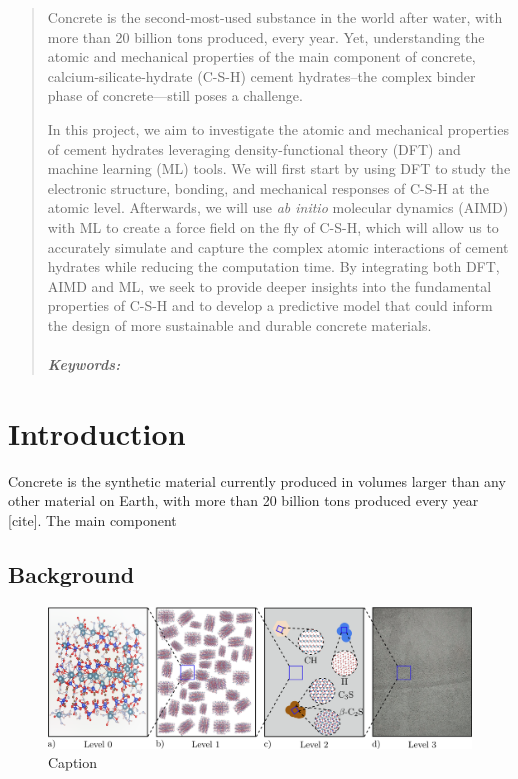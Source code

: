 \documentclass[11pt, titlepage, twoside, openright, usernames, dvipsnames]{thesis}
\theoremstyle{definition}
\theoremstyle{definition}
\begin{document}
\begin{abstract} 
Concrete is the second-most-used substance in the world after water, with more than 20 billion tons produced, every year. Yet, understanding the atomic and mechanical properties of the main component of concrete, calcium-silicate-hydrate (C-S-H) cement hydrates--the complex binder phase of concrete---still poses a challenge.
  
In this project, we aim to investigate the atomic and mechanical properties of cement hydrates leveraging density-functional theory (DFT) and machine learning (ML) tools. We will first start by using DFT to study the electronic structure, bonding, and mechanical responses of C-S-H  at the atomic level. Afterwards, we will use \emph{ab initio} molecular dynamics (AIMD) with ML to create a force field on the fly of C-S-H, which will allow us to accurately simulate and capture the complex atomic interactions of cement hydrates while reducing the computation time. By integrating both DFT, AIMD and ML, we seek to provide deeper insights into the fundamental properties of C-S-H and to develop a predictive model that could inform the design of more sustainable and durable concrete materials. \cite{Oey}
 \\
  \\
 \emph{\textbf{Keywords:}}
\end{abstract}

\tableofcontents
{}
\listoffigures
{}
\listoftables
{}


\mainbody
\chapter{Introduction}\label{Introduction}\glsresetall 
  Concrete is the synthetic material currently produced in volumes larger than any other material on Earth, with more than 20 billion tons produced every year  [cite]. The main component 

  \section{Background}\label{Background}

  \begin{figure}[H]
    \centering
    \includegraphics[width=1\textwidth]{levels.png}
    \caption{Caption}
    \label{fig:C-S-H}
  \end{figure}






\printglossary[type=\acronymtype, title={Abbreviations}]
\end{document}
